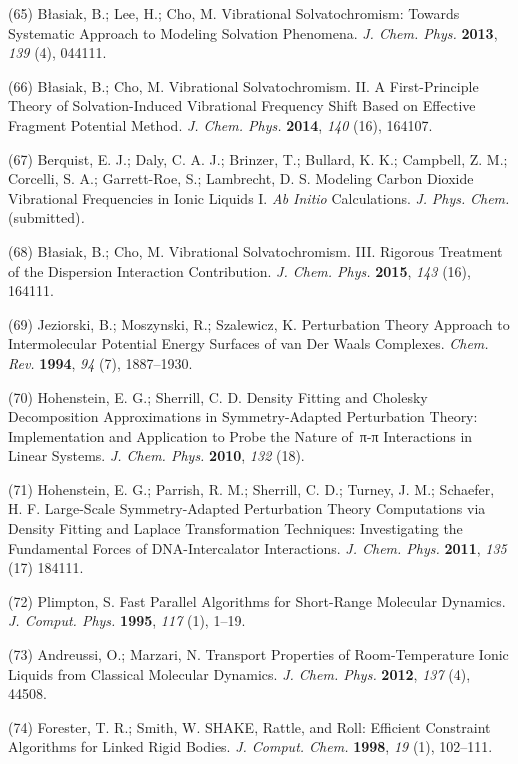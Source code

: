 (65) Błasiak, B.; Lee, H.; Cho, M. Vibrational Solvatochromism: Towards Systematic Approach to Modeling Solvation Phenomena. \emph{J. Chem.  Phys.} \textbf{2013}, \emph{139} (4), 044111.

(66) Błasiak, B.; Cho, M. Vibrational Solvatochromism. II. A First-Principle Theory of Solvation-Induced Vibrational Frequency Shift Based on Effective Fragment Potential Method. \emph{J. Chem. Phys.}  \textbf{2014}, \emph{140} (16), 164107.

(67) Berquist, E. J.; Daly, C. A. J.; Brinzer, T.; Bullard, K. K.; Campbell, Z. M.; Corcelli, S. A.; Garrett-Roe, S.; Lambrecht, D. S.  Modeling Carbon Dioxide Vibrational Frequencies in Ionic Liquids I.  \emph{Ab Initio} Calculations. \emph{J.} \emph{Phys.} \emph{Chem.}  (submitted)\emph{.}

(68) Błasiak, B.; Cho, M. Vibrational Solvatochromism. III. Rigorous Treatment of the Dispersion Interaction Contribution. \emph{J. Chem.  Phys.} \textbf{2015}, \emph{143} (16), 164111.

(69) Jeziorski, B.; Moszynski, R.; Szalewicz, K. Perturbation Theory Approach to Intermolecular Potential Energy Surfaces of van Der Waals Complexes. \emph{Chem. Rev.} \textbf{1994}, \emph{94} (7), 1887--1930.

(70) Hohenstein, E. G.; Sherrill, C. D. Density Fitting and Cholesky Decomposition Approximations in Symmetry-Adapted Perturbation Theory: Implementation and Application to Probe the Nature of\, π-π Interactions in Linear Systems. \emph{J. Chem. Phys.} \textbf{2010}, \emph{132} (18).

(71) Hohenstein, E. G.; Parrish, R. M.; Sherrill, C. D.; Turney, J. M.; Schaefer, H. F. Large-Scale Symmetry-Adapted Perturbation Theory Computations via Density Fitting and Laplace Transformation Techniques: Investigating the Fundamental Forces of DNA-Intercalator Interactions.  \emph{J. Chem. Phys.} \textbf{2011}, \emph{135} (17) 184111.

(72) Plimpton, S. Fast Parallel Algorithms for Short-Range Molecular Dynamics. \emph{J. Comput. Phys.} \textbf{1995}, \emph{117} (1), 1--19.

(73) Andreussi, O.; Marzari, N. Transport Properties of Room-Temperature Ionic Liquids from Classical Molecular Dynamics. \emph{J. Chem. Phys.}  \textbf{2012}, \emph{137} (4), 44508.

(74) Forester, T. R.; Smith, W. SHAKE, Rattle, and Roll: Efficient Constraint Algorithms for Linked Rigid Bodies. \emph{J. Comput. Chem.}  \textbf{1998}, \emph{19} (1), 102--111.


